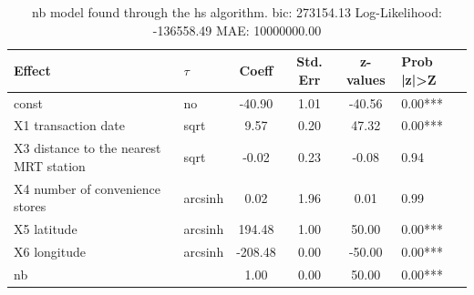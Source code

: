 \begin{table}
	\caption{nb model found through the hs algorithm. bic: 273154.13 Log-Likelihood: -136558.49 MAE: 10000000.00}
	\begin{center}
		\begin{tabular}{|l|l|c|c|c|l|}
			\hline
			Effect & $\tau$ & Coeff & Std. Err & z-values & Prob |z|>Z \\
			\hline
			const & no & -40.90 & 1.01 & -40.56 & 0.00*** \\
			\hline
			X1 transaction date & sqrt & 9.57 & 0.20 & 47.32 & 0.00*** \\
			\hline
			X3 distance to the nearest MRT station & sqrt & -0.02 & 0.23 & -0.08 & 0.94 \\
			\hline
			X4 number of convenience stores & arcsinh & 0.02 & 1.96 & 0.01 & 0.99 \\
			\hline
			X5 latitude & arcsinh & 194.48 & 1.00 & 50.00 & 0.00*** \\
			\hline
			X6 longitude & arcsinh & -208.48 & 0.00 & -50.00 & 0.00*** \\
			\hline
			nb &  & 1.00 & 0.00 & 50.00 & 0.00*** \\
			\hline
		\end{tabular}
	\end{center}
\end{table}